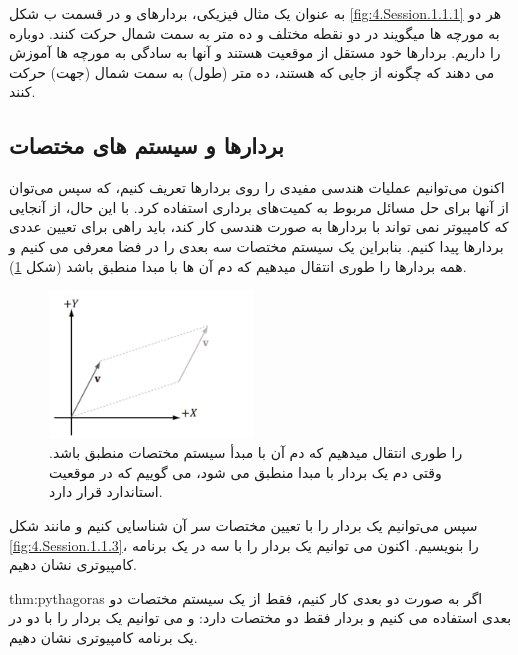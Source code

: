 {\begin{spacing}{1.4}
        به عنوان یک مثال فیزیکی، بردارهای  و  در قسمت ب شکل \ref{fig:4.Session.1.1.1} هر دو به مورچه ها میگویند در دو نقطه مختلف  و  ده متر به سمت شمال حرکت کنند.
        دوباره  را داریم.
        بردارها خود مستقل از موقعیت هستند و
        آنها به سادگی به مورچه ها آموزش می دهند که چگونه از جایی که هستند، ده متر (طول) به سمت شمال (جهت) حرکت کنند.

    \end{spacing}
}

\subsection{\textbf{\LARGE بردارها و سیستم های مختصات}}
{
    \Large
    \begin{spacing}{1.5}
        اکنون می‌توانیم عملیات هندسی مفیدی را روی بردارها تعریف کنیم، که سپس می‌توان از آنها برای حل مسائل مربوط به کمیت‌های برداری استفاده کرد.
        با این حال، از آنجایی که کامپیوتر نمی تواند با بردارها به صورت هندسی کار کند، باید راهی برای تعیین عددی بردارها پیدا کنیم.
        بنابراین یک سیستم مختصات سه بعدی را در فضا معرفی می کنیم و همه بردارها را طوری انتقال میدهیم که دم آن ها با مبدا منطبق باشد (شکل \ref{fig:4.Session.1.1.2}).

        \begin{figure}[H]
            \centering
            \setlength{\belowcaptionskip}{-10pt}
            \includegraphics[width=0.48\textwidth]{Images/4/4.Session.1.1.2}
            \caption{ را طوری انتقال میدهیم که دم آن با مبدأ سیستم مختصات منطبق
            باشد. وقتی دم یک بردار با مبدا منطبق می شود، می گوییم که در موقعیت استاندارد قرار دارد.}
            \label{fig:4.Session.1.1.2}
        \end{figure}

        سپس می‌توانیم یک بردار را با تعیین مختصات سر آن شناسایی کنیم و مانند شکل \ref{fig:4.Session.1.1.3}،  را بنویسیم.
        اکنون می توانیم یک بردار را با سه  در یک برنامه کامپیوتری نشان دهیم.

        \begin{theo}{thm:pythagoras}
            \Large
            اگر به صورت دو بعدی کار کنیم، فقط از یک سیستم مختصات دو بعدی استفاده می کنیم و بردار فقط دو مختصات دارد:
             و می توانیم یک بردار را با دو  در یک برنامه کامپیوتری نشان دهیم.
        \end{theo}


\end{spacing}}
